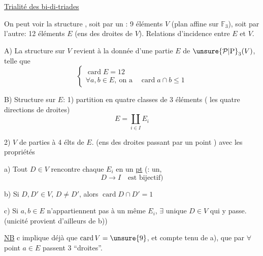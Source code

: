 
\uline{Trialité des bi-di-triades}

On peut voir la structure , soit par un : 9 éléments $V$ (plan affine sur $\mathbb F_3$), soit par l'autre: 12 éléments $E$ (ens des droites de $V$). Relations d'incidence entre $E$ et $V$.


A) La structure sur $V$ revient à la donnée d'une partie $E$ de $\unsure{\mathcal P|\mathrm P}_3(V)$, telle que
\[
\left\{\begin{array}{l}
\operatorname{card}E=12\\
\forall a,b\in E,\ \text{on a}\quad \operatorname{card}a\cap b\leq1
\end{array}\right.
\]


B) Structure sur $E$: 1) partition en quatre classes de 3 éléments ( les quatre directions de droites)
\[
E=\coprod_{i\in I}E_i
\]

2)  $V$ de parties à 4 élts de $E$. (ens des droites passant par un point ) avec les propriétés

a) Tout  $D\in V$ rencontre chaque $E_i$ en  un \uline{pt} (:  un,   
\[
D\longrightarrow I\quad\text{est bijectif})
\]

b) Si $D,D'\in V$, $D\neq D'$, alors $\operatorname{card}D\cap D'=1$


c) Si $a,b\in E$ n'appartiennent pas à un même $E_i$, $\exists$ unique $D\in V$ qui y passe. (unicité provient d'ailleurs de b))


\uline{NB} c implique déjà que $\operatorname{card}V=\unsure{9}$, et compte tenu de a), que par $\forall$ point $a\in E$ passent  3 ``droites''.
